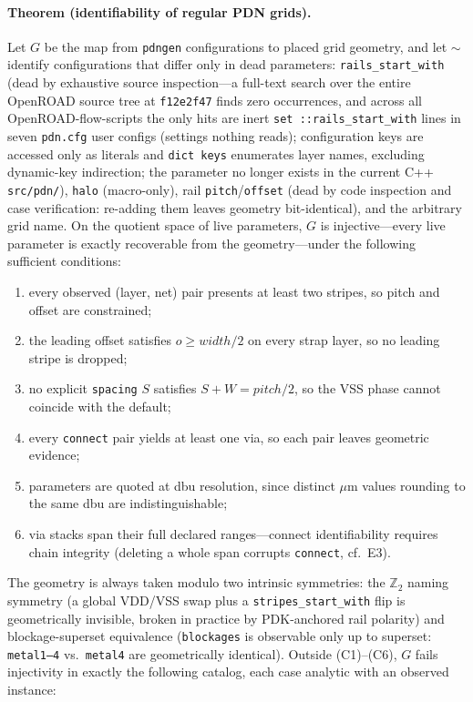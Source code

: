 \documentclass[11pt]{article}
\begin{document}
\paragraph{Theorem (identifiability of regular PDN grids).}  Let $G$ be
the map from \texttt{pdngen} configurations to placed grid geometry, and
let $\sim$ identify configurations that differ only in dead parameters:
\texttt{rails\_start\_with} (dead by exhaustive source
inspection---a full-text search over the entire OpenROAD source tree at
\texttt{f12e2f47} finds zero occurrences, and across all
OpenROAD-flow-scripts the only hits are inert \texttt{set
::rails\_start\_with} lines in seven \texttt{pdn.cfg} user configs
(settings nothing reads); configuration keys are accessed only as
literals and \texttt{dict keys} enumerates layer names, excluding
dynamic-key indirection; the parameter no longer exists in the current
C++ \texttt{src/pdn/}), \texttt{halo}
(macro-only), rail \texttt{pitch}/\texttt{offset} (dead by code
inspection and case verification: re-adding them leaves geometry
bit-identical), and the arbitrary grid name.
On the quotient space of live parameters, $G$ is injective---every live
parameter is exactly recoverable from the geometry---under the following
sufficient conditions:
\begin{enumerate}
\item[(C1)] every observed (layer, net) pair presents at least two
stripes, so pitch and offset are constrained;
\item[(C2)] the leading offset satisfies $o \geq \mathit{width}/2$ on
every strap layer, so no leading stripe is dropped;
\item[(C3)] no explicit \texttt{spacing} $S$ satisfies
$S + W = \mathit{pitch}/2$, so the VSS phase cannot coincide with the
default;
\item[(C4)] every \texttt{connect} pair yields at least one via, so each
pair leaves geometric evidence;
\item[(C5)] parameters are quoted at dbu resolution, since distinct
$\mu$m values rounding to the same dbu are indistinguishable;
\item[(C6)] via stacks span their full declared ranges---connect
identifiability requires chain integrity (deleting a whole span corrupts
\texttt{connect}, cf.\ E3).
\end{enumerate}
The geometry is always taken modulo two intrinsic symmetries: the
$\mathbb{Z}_2$ naming symmetry (a global VDD/VSS swap plus a
\texttt{stripes\_start\_with} flip is geometrically invisible, broken in
practice by PDK-anchored rail polarity) and blockage-superset
equivalence (\texttt{blockages} is observable only up to superset:
\texttt{metal1--4} vs.\ \texttt{metal4} are geometrically identical).
Outside (C1)--(C6), $G$ fails injectivity in exactly the following
catalog, each case analytic with an observed instance:
\end{document}
